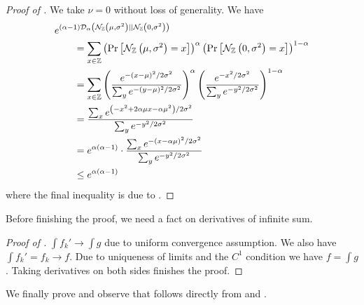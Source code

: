 \documentclass{article}
\begin{document}
\begin{proof}[Proof of ]
	We take $\nu=0$ without loss of generality.
	We have
	\begin{align}
		&e^{(\alpha-1)\mathcal{D}_\alpha\left(\mathcal{N}_{\mathbb{Z}}\left(\mu, \sigma^2\right) || \mathcal{N}_{\mathbb{Z}}\left(0, \sigma^2\right)\right)}\\
		&\qquad=\sum_{x\in\mathbb{Z}}\left(\Pr\left[\mathcal{N}_{\mathbb{Z}}\left(\mu, \sigma^2\right)=x\right]\right)^\alpha\left(\Pr\left[\mathcal{N}_{\mathbb{Z}}\left(0, \sigma^2\right)=x\right]\right)^{1-\alpha}\\
		&\qquad=\sum_{x\in\mathbb{Z}}
			\left(
				\frac{e^{-(x-\mu)^2/2\sigma^2}}{\sum_y e^{-(y-\mu)^2/2\sigma^2}}
			\right)^\alpha
			\left(
				\frac{e^{-x^2/2\sigma^2}}{\sum_y e^{-y^2/2\sigma^2}}
			\right)^{1-\alpha}\\
		&\qquad=\frac{\sum_x e^{\left(-x^2+2\alpha\mu x-\alpha\mu^2\right)/2\sigma^2}}{\sum_y e^{-y^2/2\sigma^2}}\\
		&\qquad=e^{\alpha(\alpha-1)}\cdot\frac{\sum_x e^{-\left(x-\alpha\mu\right)^2/2\sigma^2}}{\sum_y e^{-y^2/2\sigma^2}}\\
		&\qquad\leq e^{\alpha(\alpha-1)}
	\end{align}
	where the final inequality is due to .
\end{proof}

Before finishing the proof, we need a fact on derivatives of infinite sum.
\begin{proof}[Proof of ]
	$\int f_k'\rightarrow \int g$ due to uniform convergence assumption.
	We also have $\int f_k'=f_k\rightarrow f$.
	Due to uniqueness of limits and the $C^1$ condition we have $f=\int g$.
	Taking derivatives on both sides finishes the proof.
\end{proof}

We finally prove  and observe that  follows directly from  and .
\end{document}
